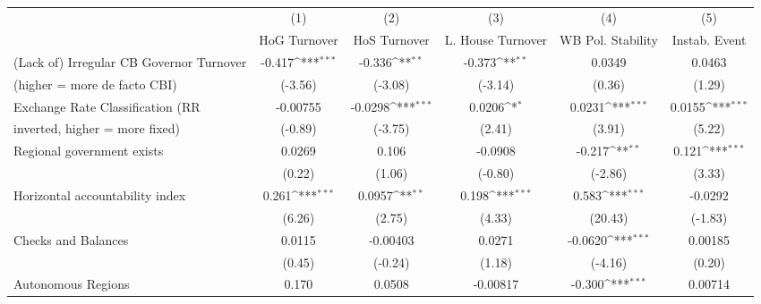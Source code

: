 \begin{table}[htbp]\centering
\def\sym#1{\ifmmode^{#1}\else\(^{#1}\)\fi}
\caption{\label{nccmultIndOLSDF}}
\begin{tabular}{l*{5}{c}}
\toprule
                                        &\multicolumn{1}{c}{(1)}&\multicolumn{1}{c}{(2)}&\multicolumn{1}{c}{(3)}&\multicolumn{1}{c}{(4)}&\multicolumn{1}{c}{(5)}\\
                                        &\multicolumn{1}{c}{HoG Turnover}&\multicolumn{1}{c}{HoS Turnover}&\multicolumn{1}{c}{L. House Turnover}&\multicolumn{1}{c}{WB Pol. Stability}&\multicolumn{1}{c}{Instab. Event}\\
\midrule
(Lack of) Irregular CB Governor Turnover&   -0.417\sym{***}&   -0.336\sym{**} &   -0.373\sym{**} &   0.0349         &   0.0463         \\
(higher = more de facto CBI)            &  (-3.56)         &  (-3.08)         &  (-3.14)         &   (0.36)         &   (1.29)         \\
\addlinespace
Exchange Rate Classification (RR        & -0.00755         &  -0.0298\sym{***}&   0.0206\sym{*}  &   0.0231\sym{***}&   0.0155\sym{***}\\
inverted, higher = more fixed)          &  (-0.89)         &  (-3.75)         &   (2.41)         &   (3.91)         &   (5.22)         \\
\addlinespace
Regional government exists              &   0.0269         &    0.106         &  -0.0908         &   -0.217\sym{**} &    0.121\sym{***}\\
                                        &   (0.22)         &   (1.06)         &  (-0.80)         &  (-2.86)         &   (3.33)         \\
\addlinespace
Horizontal accountability index         &    0.261\sym{***}&   0.0957\sym{**} &    0.198\sym{***}&    0.583\sym{***}&  -0.0292         \\
                                        &   (6.26)         &   (2.75)         &   (4.33)         &  (20.43)         &  (-1.83)         \\
\addlinespace
Checks and Balances                     &   0.0115         & -0.00403         &   0.0271         &  -0.0620\sym{***}&  0.00185         \\
                                        &   (0.45)         &  (-0.24)         &   (1.18)         &  (-4.16)         &   (0.20)         \\
\addlinespace
Autonomous Regions                      &    0.170         &   0.0508         & -0.00817         &   -0.300\sym{***}&  0.00714         \\

\end{tabular}
\end{table}
